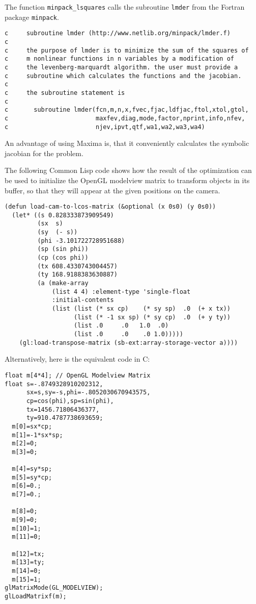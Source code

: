 The function \verb!minpack_lsquares! calls the subroutine \verb!lmder!
from the Fortran package \verb!minpack!.

{\small
\begin{verbatim}
c     subroutine lmder (http://www.netlib.org/minpack/lmder.f)
c
c     the purpose of lmder is to minimize the sum of the squares of
c     m nonlinear functions in n variables by a modification of
c     the levenberg-marquardt algorithm. the user must provide a
c     subroutine which calculates the functions and the jacobian.
c
c     the subroutine statement is
c
c       subroutine lmder(fcn,m,n,x,fvec,fjac,ldfjac,ftol,xtol,gtol,
c                        maxfev,diag,mode,factor,nprint,info,nfev,
c                        njev,ipvt,qtf,wa1,wa2,wa3,wa4)
\end{verbatim}
}

An advantage of using Maxima is, that it conveniently calculates the
symbolic jacobian for the problem.

The following Common Lisp code shows how the result of the
optimization can be used to initialize the OpenGL modelview matrix to
transform objects in its buffer, so that they will appear at the given
positions on the camera.

{\small
\begin{verbatim}
(defun load-cam-to-lcos-matrix (&optional (x 0s0) (y 0s0))
  (let* ((s 0.828333873909549)
         (sx  s)
         (sy  (- s))
         (phi -3.101722728951688)
         (sp (sin phi))
         (cp (cos phi))
         (tx 608.4330743004457)
         (ty 168.9188383630887)
         (a (make-array
             (list 4 4) :element-type 'single-float
             :initial-contents
             (list (list (* sx cp)    (* sy sp)  .0  (+ x tx))
                   (list (* -1 sx sp) (* sy cp)  .0  (+ y ty))
                   (list .0     .0   1.0  .0)
                   (list .0     .0    .0 1.0)))))
    (gl:load-transpose-matrix (sb-ext:array-storage-vector a))))    
\end{verbatim}
}
  
Alternatively, here is the equivalent code in C:

{\small
\begin{verbatim}
float m[4*4]; // OpenGL Modelview Matrix
float s=-.8749328910202312,
      sx=s,sy=-s,phi=-.8052030670943575,
      cp=cos(phi),sp=sin(phi),
      tx=1456.71806436377,
      ty=910.4787738693659;
  m[0]=sx*cp;
  m[1]=-1*sx*sp;
  m[2]=0;
  m[3]=0;
  
  m[4]=sy*sp;
  m[5]=sy*cp;
  m[6]=0.;
  m[7]=0.;

  m[8]=0;
  m[9]=0;
  m[10]=1;
  m[11]=0;
  
  m[12]=tx;
  m[13]=ty;
  m[14]=0;
  m[15]=1;
glMatrixMode(GL_MODELVIEW);
glLoadMatrixf(m);
\end{verbatim}
}

